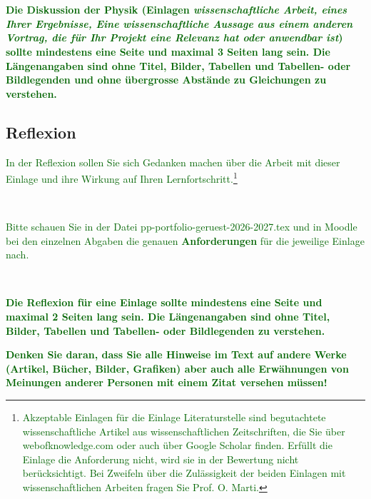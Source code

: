 \documentclass[pdftex,12pt,twoside,footsepline,headsepline,a4paper,final]{scrreprt}
\begin{document}
$_{}$

\begin{Large}
\end{Large}

$_{}$

\textcolor{darkgreen}{\textbf{Die Diskussion der Physik (Einlagen \emph{wissenschaftliche Arbeit, eines Ihrer Ergebnisse, Eine wissenschaftliche Aussage aus einem anderen Vortrag, die f\"{u}r Ihr Projekt eine Relevanz hat oder anwendbar ist}) sollte mindestens eine Seite und maximal 3 Seiten lang sein.  Die L\"{a}ngenangaben sind ohne Titel, Bilder, Tabellen und Tabellen- oder Bildlegenden und ohne \"{u}bergrosse Abst\"{a}nde zu Gleichungen zu verstehen.
}}


\subsection{Reflexion}

\textcolor{darkgreen}{In der Reflexion sollen Sie sich Gedanken machen \"{u}ber die Arbeit mit dieser Einlage und ihre Wirkung auf Ihren Lernfortschritt.}\footnote{\textcolor{darkgreen}{Akzeptable  Einlagen f\"{u}r die Einlage Literaturstelle sind begutachtete wissenschaftliche Artikel aus wissenschaftlichen Zeitschriften, die Sie \"{u}ber webofknowledge.com oder auch \"{u}ber Google Scholar finden. Erf\"{u}llt die Einlage die Anforderung nicht, wird sie in der Bewertung nicht ber\"{u}cksichtigt. Bei Zweifeln \"{u}ber die Zul\"{a}ssigkeit der beiden Einlagen mit wissenschaftlichen Arbeiten fragen Sie Prof. O. Marti.}}

$_{}$

\begin{Large}
  \textcolor{darkgreen}{Bitte schauen Sie in der Datei \flqq pp-portfolio-geruest-2026-2027.tex\frqq{} und in Moodle bei den einzelnen Abgaben die genauen \textbf{Anforderungen} f\"{u}r die jeweilige Einlage nach.}
\end{Large}

$_{}$

\textcolor{darkgreen}{\textbf{Die Reflexion f\"{u}r eine Einlage sollte mindestens eine Seite und maximal 2 Seiten lang sein.  Die L\"{a}ngenangaben sind ohne Titel, Bilder, Tabellen und Tabellen- oder Bildlegenden zu verstehen.
}}

\textcolor{darkgreen}{\textbf{Denken Sie daran, dass Sie alle Hinweise im Text auf andere Werke (Artikel, B\"{u}cher, Bilder, Grafiken) aber auch alle Erw\"{a}hnungen von Meinungen anderer Personen mit einem Zitat versehen m\"{u}ssen!
}}
\end{document}
